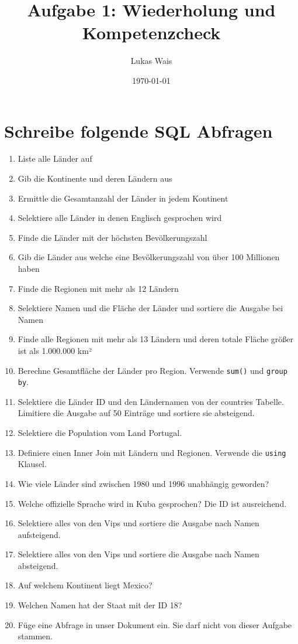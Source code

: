 \documentclass[11pt]{article}
\author{Lukas Wais}
\date{\today}
\title{Aufgabe 1: Wiederholung und Kompetenzcheck}
\begin{document}
\maketitle

\section*{Schreibe folgende SQL Abfragen}
\label{sec:org11061c4}

\begin{enumerate}
\item Liste alle Länder auf
\item Gib die Kontinente und deren Ländern aus
\item Ermittle die Gesamtanzahl der Länder in jedem Kontinent
\item Selektiere alle Länder in denen Englisch gesprochen wird
\item Finde die Länder mit der höchsten Bevölkerungszahl
\item Gib die Länder aus welche eine Bevölkerungszahl von über 100 Millionen haben
\item Finde die Regionen mit mehr als 12 Ländern
\item Selektiere Namen und die Fläche der Länder und sortiere die Ausgabe bei Namen
\item Finde alle Regionen mit mehr als 13 Ländern und deren totale Fläche größer
ist als 1.000.000 km²
\item Berechne Gesamtfläche der Länder pro Region. Verwende \texttt{sum()} und \texttt{group by}.
\item Selektiere die Länder ID und den Ländernamen von der countries Tabelle.
Limitiere die Ausgabe auf 50 Einträge und sortiere sie absteigend.
\item Selektiere die Population vom Land Portugal.
\item Definiere einen Inner Join mit Ländern und Regionen.
Verwende die \texttt{using} Klausel.
\item Wie viele Länder sind zwischen 1980 und 1996 unabhängig geworden?
\item Welche offizielle Sprache wird in Kuba gesprochen? Die ID ist ausreichend.
\item Selektiere alles von den Vips und sortiere die Ausgabe nach Namen aufsteigend.
\item Selektiere alles von den Vips und sortiere die Ausgabe nach Namen absteigend.
\item Auf welchem Kontinent liegt Mexico?
\item Welchen Namen hat der Staat mit der ID 18?
\item Füge eine Abfrage in unser Dokument ein. Sie darf nicht von dieser Aufgabe stammen.
\end{enumerate}
\end{document}
